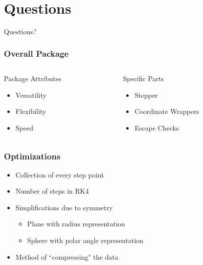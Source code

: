 \documentclass{beamer}
\begin{document}
\section{Questions}

\begin{frame}
	
	\Huge{\centerline{Questions?}}
	
\end{frame}


\appendix




\begin{frame}
	
	\frametitle{Overall Package}
	
	\begin{columns}
		\begin{column}{0.5\textwidth}
			Package Attributes
			\begin{itemize}
				\item Versatility
				\item Flexibility
				\item Speed
			\end{itemize}
		\end{column}
		
		\begin{column}{0.5\textwidth}
			Specific Parts
			\begin{itemize}
				\item Stepper
				\item Coordinate Wrappers
				\item Escape Checks
			\end{itemize}
		\end{column}
	\end{columns}
	
\end{frame}


\begin{frame}
	
	\frametitle{Optimizations}
	
	\begin{itemize}
		\item Collection of every step point
		\item Number of steps in RK4
		\item Simplifications due to symmetry
		\begin{itemize}
			\item Plane with radius representation
			\item Sphere with polar angle representation
		\end{itemize}
		\item Method of ``compressing" the data
	\end{itemize}
	
\end{frame}
\end{document}
